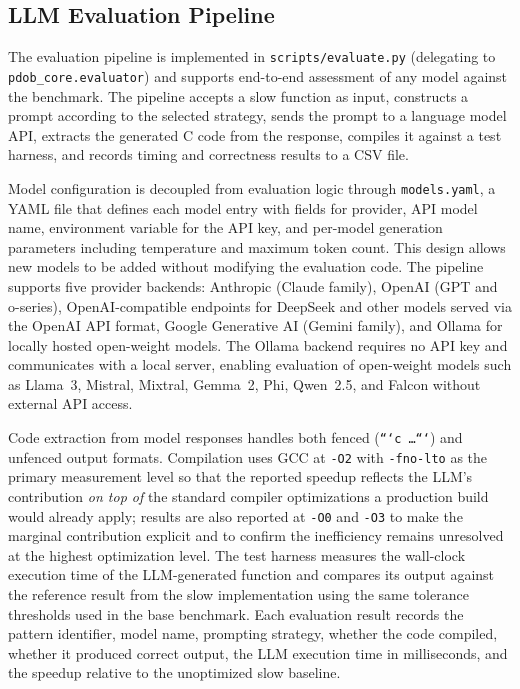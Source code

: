 \subsection{LLM Evaluation Pipeline}

The evaluation pipeline is implemented in \texttt{scripts/evaluate.py} (delegating to \texttt{pdob\_core.evaluator}) and supports end-to-end assessment of any model against the benchmark. The pipeline accepts a slow function as input, constructs a prompt according to the selected strategy, sends the prompt to a language model API, extracts the generated C code from the response, compiles it against a test harness, and records timing and correctness results to a CSV file.

Model configuration is decoupled from evaluation logic through \texttt{models.yaml}, a YAML file that defines each model entry with fields for provider, API model name, environment variable for the API key, and per-model generation parameters including temperature and maximum token count. This design allows new models to be added without modifying the evaluation code. The pipeline supports five provider backends: Anthropic (Claude family), OpenAI (GPT and o-series), OpenAI-compatible endpoints for DeepSeek and other models served via the OpenAI API format, Google Generative AI (Gemini family), and Ollama for locally hosted open-weight models. The Ollama backend requires no API key and communicates with a local server, enabling evaluation of open-weight models such as Llama~3, Mistral, Mixtral, Gemma~2, Phi, Qwen~2.5, and Falcon without external API access.

Code extraction from model responses handles both fenced (\texttt{```c \ldots ```}) and unfenced output formats. Compilation uses GCC at \texttt{-O2} with \texttt{-fno-lto} as the primary measurement level so that the reported speedup reflects the LLM's contribution \emph{on top of} the standard compiler optimizations a production build would already apply; results are also reported at \texttt{-O0} and \texttt{-O3} to make the marginal contribution explicit and to confirm the inefficiency remains unresolved at the highest optimization level. The test harness measures the wall-clock execution time of the LLM-generated function and compares its output against the reference result from the slow implementation using the same tolerance thresholds used in the base benchmark. Each evaluation result records the pattern identifier, model name, prompting strategy, whether the code compiled, whether it produced correct output, the LLM execution time in milliseconds, and the speedup relative to the unoptimized slow baseline.

